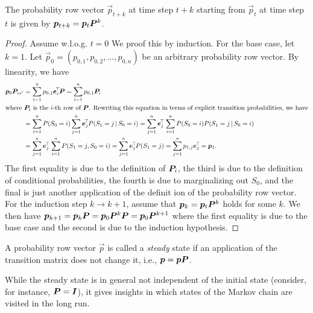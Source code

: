 		\begin{theorem}
			The probability row vector \( \vec{p}_{t + k} \) at time step \(t + k\) starting from \(\vec{p}_t\) at time step \(t\) is given by \( \bm{p}_{t + k} = \bm{p}_t \bm{P}^k \).
		\end{theorem}
		\begin{proof}
			Assume w.l.o.g. \( t = 0 \) We proof this by induction. For the base case, let \(k = 1\). Let \( \vec{p}_0 = (p_{0, 1}, p_{0, 2}, \dots, p_{0, n}) \) be an arbitrary probability row vector. By linearity, we have
			\begin{align}
				\vec{p}_0 \mat{P}_{ss'}
					&= \sum_{i = 1}^{n} p_{0, 1} \vec{e}_i^\transposed \mat{P}
					 = \sum_{i = 1}^{n} p_{0, 1} \mat{P}_i \\
				\intertext{where \(\mat{P}_i\) is the \(i\)-th row of \(\mat{P}\). Rewriting this equation in terms of explicit transition probabilities, we have}
					&= \sum_{i = 1}^{n} P(S_0 = i) \sum_{j = 1}^{n} \vec{e}_j^\transposed P(S_1 = j \given S_0 = i)
					 = \sum_{j = 1}^{n} \vec{e}_j^\transposed \,\sum_{i = 1}^{n} P(S_0 = i) P(S_1 = j \given S_0 = i) \\
					&= \sum_{j = 1}^{n} \vec{e}_j^\transposed \,\sum_{i = 1}^{n} P(S_1 = j, S_0 = i)
					 = \sum_{j = 1}^{n} \vec{e}_j^\transposed P(S_1 = j)
					 = \sum_{j = 1}^{n} p_{1, j} \vec{e}_j^\transposed
					 = \vec{p}_1.
			\end{align}
			The first equality is due to the definition of \(\bm{P}_i\), the third is due to the definition of conditional probabilities, the fourth is due to marginalizing out \(S_0\), and the final is just another application of the definit ion of the probability row vector. For the induction step \( k \to k + 1 \), assume that \( \bm{p}_k = \bm{p}_t \bm{P}^k \) holds for some \(k\). We then have \( \bm{p}_{k + 1} = \bm{p}_k \bm{P} = \bm{p}_0 \bm{P}^k \bm{P} = \bm{p}_0 \bm{P}^{k + 1} \) where the first equality is due to the base case and the second is due to the induction hypothesis.
		\end{proof}

		\begin{definition}
			A probability row vector \(\vec{p}\) is called a \emph{steady} state if an application of the transition matrix does not change it, i.e., \( \bm{p} = \bm{p} \bm{P} \).
		\end{definition}
		\begin{remark}
			While the steady state is in general not independent of the initial state (consider, for instance, \( \bm{P} = \bm{I} \)), it gives insights in which states of the Markov chain are visited in the long run.
		\end{remark}

